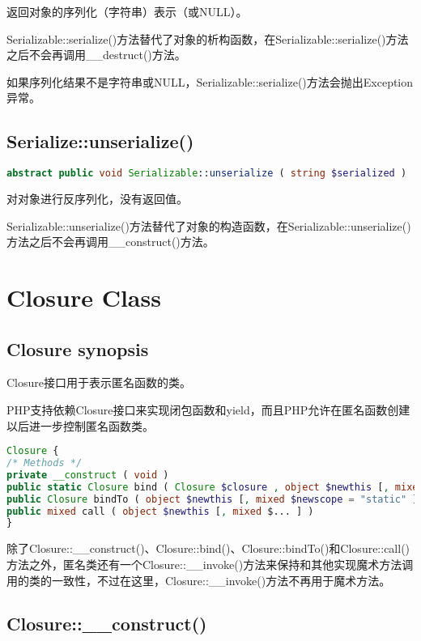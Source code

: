 返回对象的序列化（字符串）表示（或NULL）。

Serializable::serialize()方法替代了对象的析构函数，在Serializable::serialize()方法之后不会再调用\_\_destruct()方法。

如果序列化结果不是字符串或NULL，Serializable::serialize()方法会抛出Exception异常。

\section{Serialize::unserialize()}




\begin{lstlisting}[language=PHP]
abstract public void Serializable::unserialize ( string $serialized )
\end{lstlisting}

对对象进行反序列化，没有返回值。

Serializable::unserialize()方法替代了对象的构造函数，在Serializable::unserialize()方法之后不会再调用\_\_construct()方法。




\chapter{Closure Class}


\section{Closure synopsis}

Closure接口用于表示匿名函数的类。

PHP支持依赖Closure接口来实现闭包函数和yield，而且PHP允许在匿名函数创建以后进一步控制匿名函数类。




\begin{lstlisting}[language=PHP]
Closure {
/* Methods */
private __construct ( void )
public static Closure bind ( Closure $closure , object $newthis [, mixed $newscope = "static" ] )
public Closure bindTo ( object $newthis [, mixed $newscope = "static" ] )
public mixed call ( object $newthis [, mixed $... ] )
}
\end{lstlisting}

除了Closure::\_\_construct()、Closure::bind()、Closure::bindTo()和Closure::call()方法之外，匿名类还有一个Closure::\_\_invoke()方法来保持和其他实现魔术方法调用的类的一致性，不过在这里，Closure::\_\_invoke()方法不再用于魔术方法。

\section{Closure::\_\_construct()}




